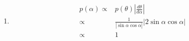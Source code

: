 \documentclass[10pt,a4paper]{article}
\begin{document}
\begin{enumerate}
\begin{enumerate}
\item 
\begin{align*}
p(\alpha) \propto&  p(\theta)|\frac{d\theta}{d\alpha}| \\
\propto & \frac{1}{|\sin\alpha\cos\alpha|}|2\sin \alpha\cos \alpha| \\
\propto & 1 \\
\end{align*}
\end{enumerate}
\end{enumerate}
\end{document}
